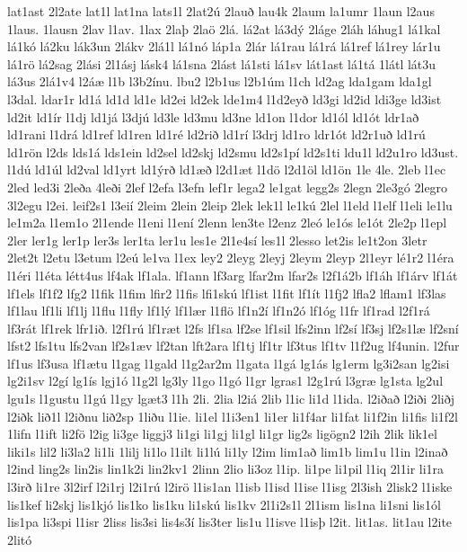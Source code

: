 {lat1ast
2l2ate
lat1l
lat1na
lats1l
2lat2ú
2lauð
lau4k
2laum
la1umr
1laun
l2aus
1laus.
1lausn
2lav
l1av.
1lax
2laþ
2laö
2lá.
lá2at
lá3dý
2láge
2láh
láhug1
lá1kal
lá1kó
lá2ku
lák3un
2lákv
2lá1l
lá1nó
láp1a
2lár
lá1rau
lá1rá
lá1ref
lá1rey
lár1u
lá1rö
lá2sag
2lási
2l1ásj
lásk4
lá1sna
2lást
lá1sti
lá1sv
lát1ast
lá1tá
1látl
lát3u
lá3us
2lá1v4
l2áæ
l1b
l3b2ínu.
lbu2
l2b1us
l2b1úm
l1ch
ld2ag
lda1gam
lda1gl
l3dal.
ldar1r
ld1á
ld1d
ld1e
ld2ei
ld2ek
lde1m4
l1d2eyð
ld3gi
ld2id
ldi3ge
ld3ist
ld2it
ld1ír
l1dj
ld1já
l3djú
ld3le
ld3mu
ld3ne
ld1on
l1dor
ld1ól
ld1ót
ldr1að
ld1rani
l1drá
ld1ref
ld1ren
ld1ré
ld2rið
ld1rí
l3drj
ld1ro
ldr1ót
ld2r1uð
ld1rú
ld1rön
l2ds
lds1á
lds1ein
ld2sel
ld2skj
ld2smu
ld2s1pí
ld2s1ti
ldu1l
ld2u1ro
ld3ust.
l1dú
ld1úl
ld2val
ld1yrt
ld1ýrð
ld1æð
l2d1æt
l1dö
l2d1öl
ld1ön
1le
4le.
2leb
l1ec
2led
led3i
2leða
4leði
2lef
l2efa
l3efn
lef1r
lega2
le1gat
legg2s
2legn
2le3gó
2legro
3l2egu
l2ei.
leif2s1
l3eií
2leim
2lein
2leip
2lek
lek1l
le1kú
2lel
l1eld
l1elf
l1eli
le1lu
le1m2a
l1em1o
2l1ende
l1eni
l1ení
2lenn
len3te
l2enz
2leó
le1ós
le1ót
2le2p
l1epl
2ler
ler1g
ler1p
ler3s
ler1ta
ler1u
les1e
2l1e4sí
les1l
2lesso
let2is
le1t2on
3letr
2let2t
l2etu
l3etum
l2eú
le1va
l1ex
ley2
2leyg
2leyj
2leym
2leyp
2l1eyr
lé1r2
l1éra
l1éri
l1éta
létt4us
lf4ak
lf1ala.
lf1ann
lf3arg
lfar2m
lfar2s
l2f1á2b
lf1áh
lf1árv
lf1át
lf1els
lf1f2
lfg2
l1fik
l1fim
lfir2
l1fis
lfi1skú
lf1ist
l1fit
lf1ít
l1fj2
lfla2
lflam1
lf3las
lf1lau
lf1li
lf1lj
l1flu
l1fly
lf1lý
lf1lær
l1flö
lf1n2í
lf1n2ó
lf1óg
l1fr
lf1rad
l2f1rá
lf3rát
lf1rek
lfr1ið.
l2f1rú
lf1ræt
l2fs
lf1sa
lf2se
lf1sil
lfs2inn
lf2sí
lf3sj
lf2s1læ
lf2sní
lfst2
lfs1tu
lfs2van
lf2s1æv
lf2tan
lft2ara
lf1tj
lf1tr
lf3tus
lf1tv
l1f2ug
lf4unin.
l2fur
lf1us
lf3usa
lf1ætu
l1gag
l1gald
l1g2ar2m
l1gata
l1gá
lg1ás
lg1erm
lg3i2san
lg2isi
lg2i1sv
l2gí
lg1ís
lgj1ó
l1g2l
lg3ly
l1go
l1gó
l1gr
lgras1
l2g1rú
l3græ
lg1sta
lg2ul
lgu1s
l1gustu
l1gú
l1gy
lgæt3
l1h
2li.
2lia
l2iá
2lib
l1ic
li1d
l1ida.
l2iðað
l2iði
2liðj
l2iðk
lið1l
l2iðnu
lið2sp
1liðu
l1ie.
li1el
l1i3en1
li1er
li1f4ar
li1fat
li1f2in
li1fis
li1f2l
1lifn
l1ift
li2fö
l2ig
li3ge
liggj3
li1gi
li1gj
li1gl
li1gr
lig2s
ligögn2
l2ih
2lik
lik1el
liki1s
lil2
li3la2
li1li
1lilj
li1lo
l1ilt
li1lú
li1ly
l2im
lim1að
lim1b
lim1u
l1in
l2inað
l2ind
ling2s
lin2is
lin1k2i
lin2kv1
2linn
2lio
li3oz
l1ip.
li1pe
li1pil
l1iq
2l1ir
li1ra
l3irð
li1re
3l2irf
l2i1rj
l2i1rú
l2irö
l1is1an
l1isb
l1isd
l1ise
l1isg
2l3ish
2lisk2
l1iske
lis1kef
li2skj
lis1kjó
lis1ko
lis1ku
li1skú
lis1kv
2l1i2s1l
2l1ism
lis1na
li1sni
lis1ól
lis1pa
li3spi
l1isr
2liss
lis3si
lis4s3í
lis3ter
lis1u
l1isve
l1isþ
l2it.
lit1as.
lit1au
l2ite
2litó
}
